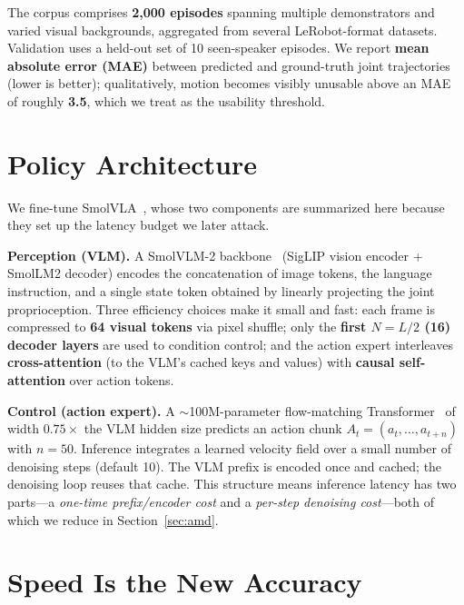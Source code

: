 \documentclass[blind]{gtac}
\begin{document}
The corpus comprises \textbf{2{,}000 episodes} spanning multiple demonstrators
and varied visual backgrounds, aggregated from several LeRobot-format datasets.
Validation uses a held-out set of 10 seen-speaker episodes. We report
\textbf{mean absolute error (MAE)} between predicted and ground-truth joint
trajectories (lower is better); qualitatively, motion becomes visibly unusable
above an MAE of roughly \textbf{3.5}, which we treat as the usability threshold.

\section{Policy Architecture}
\label{sec:model}

We fine-tune SmolVLA~\cite{smolvla}, whose two components are summarized here
because they set up the latency budget we later attack.

\textbf{Perception (VLM).} A SmolVLM-2 backbone~\cite{smolvlm} (SigLIP vision
encoder + SmolLM2 decoder) encodes the concatenation of image tokens, the
language instruction, and a single state token obtained by linearly projecting
the joint proprioception. Three efficiency choices make it small and fast:
each frame is compressed to \textbf{64 visual tokens} via pixel shuffle; only the
\textbf{first $N=L/2$ (16) decoder layers} are used to condition control; and the
action expert interleaves \textbf{cross-attention} (to the VLM's cached keys and
values) with \textbf{causal self-attention} over action tokens.

\textbf{Control (action expert).} A $\sim$100M-parameter flow-matching
Transformer~\cite{flowmatching,pi0} of width $0.75\times$ the VLM hidden size
predicts an action chunk $A_t=(a_t,\dots,a_{t+n})$ with $n=50$. Inference
integrates a learned velocity field over a small number of denoising steps
(default 10). The VLM prefix is encoded once and cached; the denoising loop
reuses that cache. This structure means inference latency has two parts---a
\emph{one-time prefix/encoder cost} and a \emph{per-step denoising cost}---both
of which we reduce in Section~\ref{sec:amd}.

\section{Speed Is the New Accuracy}
\label{sec:speed}
\end{document}

